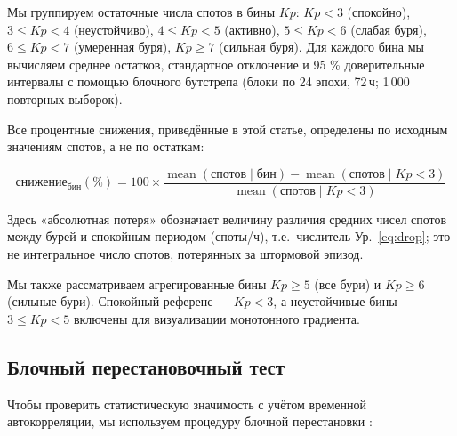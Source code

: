 \documentclass{agujournal2019}
\begin{document}
Мы группируем остаточные числа спотов в бины $Kp$: $Kp < 3$ (спокойно),
$3 \le Kp < 4$ (неустойчиво), $4 \le Kp < 5$ (активно),
$5 \le Kp < 6$ (слабая буря), $6 \le Kp < 7$ (умеренная буря),
$Kp \ge 7$ (сильная буря). Для каждого бина мы вычисляем среднее остатков,
стандартное отклонение и 95 \% доверительные интервалы с помощью блочного
бутстрепа \citep{efron1993} (блоки по 24 эпохи, 72\,ч;
1\,000 повторных выборок).

Все процентные снижения, приведённые в этой статье, определены по исходным
значениям спотов, а не по остаткам:

\begin{equation}
	\mbox{снижение}_{\mbox{бин}}(\%) = 100 \times
	\frac{\operatorname{mean}(\mbox{спотов} \mid \mbox{бин}) -
	\operatorname{mean}(\mbox{спотов} \mid Kp < 3)}
	{\operatorname{mean}(\mbox{спотов} \mid Kp < 3)}
	\label{eq:drop}
\end{equation}

Здесь «абсолютная потеря» обозначает величину различия средних чисел
спотов между бурей и спокойным периодом (споты/ч), т.е.\ числитель
Ур.~\eqref{eq:drop}; это не интегральное число спотов, потерянных
за штормовой эпизод.

Мы также рассматриваем агрегированные бины $Kp \ge 5$ (все бури) и
$Kp \ge 6$ (сильные бури). Спокойный референс — $Kp < 3$, а неустойчивые
бины $3 \le Kp < 5$ включены для визуализации монотонного градиента.

\subsection{Блочный перестановочный тест}

Чтобы проверить статистическую значимость с учётом временной
автокорреляции, мы используем процедуру блочной перестановки
\citep{davison1997}:
\end{document}
